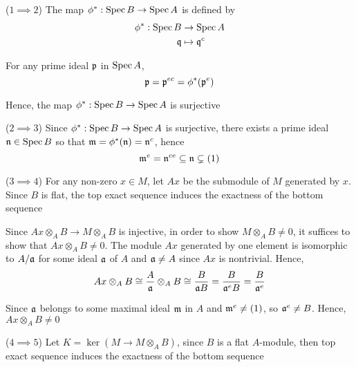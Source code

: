 \begin{longproof}
	($1 \implies 2$) The map $\phi^*: \operatorname{Spec} B \to \operatorname{Spec} A$ is defined by
	\begin{align*}
		\phi^*: \operatorname{Spec} B &\to \operatorname{Spec} A \\
		\mathfrak{q} &\mapsto \mathfrak{q}^c
	\end{align*}
	
	For any prime ideal $\mathfrak{p}$ in $\operatorname{Spec} A$, 
	$$
		\mathfrak{p} = \mathfrak{p}^{ec} = \phi^*(\mathfrak{p}^e)
	$$
	
	Hence, the map $\phi^*: \operatorname{Spec} B \to \operatorname{Spec} A$ is surjective
	
	($2 \implies 3$) Since $\phi^*: \operatorname{Spec} B \to \operatorname{Spec} A$ is surjective, there exists a prime ideal $\mathfrak{n} \in \operatorname{Spec} B$ so that $\mathfrak{m} = \phi^*(\mathfrak{n}) = \mathfrak{n}^{c}$, hence
	$$
		\mathfrak{m}^e = \mathfrak{n}^{ce} \subseteq \mathfrak{n} \subsetneq (1)
	$$
	
	($3 \implies 4$) For any non-zero $x \in M$, let $Ax$ be the submodule of $M$ generated by $x$. Since $B$ is flat, the top exact sequence induces the exactness of the bottom sequence
	
	\begin{center}
	\end{center}
	
	Since $Ax \otimes_A B \to M \otimes_A B$ is injective, in order to show $M \otimes_A B \neq 0$, it suffices to show that $Ax \otimes_A B \neq 0$. The module $Ax$ generated by one element is isomorphic to $A / \mathfrak{a}$ for some ideal $\mathfrak{a}$ of $A$ and $\mathfrak{a} \neq A$ since $Ax$ is nontrivial. Hence, 
	$$
		Ax \otimes_A B \cong \frac{A}{\mathfrak{a}} \otimes_A B \cong \frac{B}{\mathfrak{a} B} = \frac{B}{\mathfrak{a}^e B} =  \frac{B}{\mathfrak{a}^e}
	$$
	
	Since $\mathfrak{a}$ belongs to some maximal ideal $\mathfrak{m}$ in $A$ and $\mathfrak{m}^e \neq (1)$, so $\mathfrak{a}^e \neq B$. Hence, $Ax \otimes_A B \neq 0$
	
	($4 \implies 5$) Let $K = \ker (M \to M \otimes_A B)$, since $B$ is a flat $A$-module, then top exact sequence induces the exactness of the bottom sequence
	\begin{center}
	\end{center}
	

\end{longproof}
